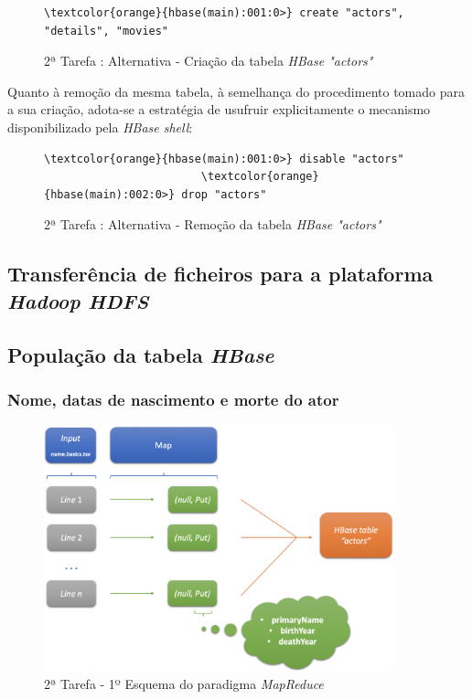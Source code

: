 \documentclass[a4paper]{report}
\begin{document}
{			\begin{figure}[H]
				{
					\color{teal}
					\begin{Verbatim}[commandchars=\\\{\}]
              \textcolor{orange}{hbase(main):001:0>} create "actors", "details", "movies"
					\end{Verbatim}
				}
				\caption{2ª Tarefa : Alternativa - Criação da tabela \textit{HBase "actors"}}
				\label{fig:14}
			\end{figure}
			
			Quanto à remoção da mesma tabela, à semelhança do procedimento tomado para a sua criação, adota-se a estratégia de usufruir explicitamente o mecanismo disponibilizado pela \textit{HBase shell}:
			\begin{figure}[H]
				{
					\color{teal}
					\begin{Verbatim}[commandchars=\\\{\}]
                        \textcolor{orange}{hbase(main):001:0>} disable "actors"
                        \textcolor{orange}{hbase(main):002:0>} drop "actors"
					\end{Verbatim}
				}
				\caption{2ª Tarefa : Alternativa - Remoção da tabela \textit{HBase "actors"}}
				\label{fig:15}
			\end{figure}

		\subsection{Transferência de ficheiros para a plataforma \textit{Hadoop HDFS}} \label{subsec:Task2-2}

		\subsection{População da tabela \textit{HBase}} \label{subsec:Task2-3}
			\subsubsection{Nome, datas de nascimento e morte do ator} \label{sssec:Task2-3-1}
			\begin{figure}[H]
				\centering
				\includegraphics[width=0.9\textwidth]{Imagens/2ª Tarefa - Esquema MapReduce.png}
				\caption{2ª Tarefa - 1º Esquema do paradigma \textit{MapReduce}}
				\label{fig:18}
			\end{figure}

}
\end{document}
